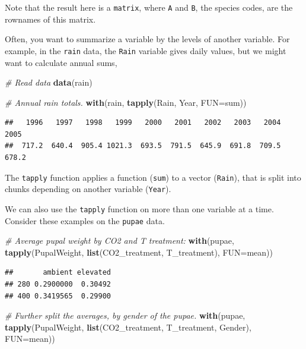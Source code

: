 \documentclass[]{book}
\newenvironment{Shaded}{\begin{snugshade}}{\end{snugshade}}
\newcommand{\CommentTok}[1]{\textcolor[rgb]{0.56,0.35,0.01}{\textit{#1}}}
\newcommand{\DataTypeTok}[1]{\textcolor[rgb]{0.13,0.29,0.53}{#1}}
\newcommand{\KeywordTok}[1]{\textcolor[rgb]{0.13,0.29,0.53}{\textbf{#1}}}
\newcommand{\NormalTok}[1]{#1}
\begin{document}
Note that the result here is a \texttt{matrix}, where \texttt{A} and \texttt{B}, the species codes, are the rownames of this matrix.

Often, you want to summarize a variable by the levels of another variable. For example, in the \texttt{rain} data, the \texttt{Rain} variable gives daily values, but we might want to calculate annual sums,

\begin{Shaded}
\begin{Highlighting}[]
\CommentTok{# Read data}
\KeywordTok{data}\NormalTok{(rain)}

\CommentTok{# Annual rain totals.}
\KeywordTok{with}\NormalTok{(rain, }\KeywordTok{tapply}\NormalTok{(Rain, Year, }\DataTypeTok{FUN=}\NormalTok{sum))}
\end{Highlighting}
\end{Shaded}

\begin{verbatim}
##   1996   1997   1998   1999   2000   2001   2002   2003   2004   2005 
##  717.2  640.4  905.4 1021.3  693.5  791.5  645.9  691.8  709.5  678.2
\end{verbatim}

The \texttt{tapply} function applies a function (\texttt{sum}) to a vector (\texttt{Rain}), that is split into chunks depending on another variable (\texttt{Year}).

We can also use the \texttt{tapply} function on more than one variable at a time. Consider these examples on the \texttt{pupae} data.

\begin{Shaded}
\begin{Highlighting}[]
\CommentTok{# Average pupal weight by CO2 and T treatment:}
\KeywordTok{with}\NormalTok{(pupae, }\KeywordTok{tapply}\NormalTok{(PupalWeight, }\KeywordTok{list}\NormalTok{(CO2_treatment, T_treatment), }\DataTypeTok{FUN=}\NormalTok{mean))}
\end{Highlighting}
\end{Shaded}

\begin{verbatim}
##       ambient elevated
## 280 0.2900000  0.30492
## 400 0.3419565  0.29900
\end{verbatim}

\begin{Shaded}
\begin{Highlighting}[]
\CommentTok{# Further split the averages, by gender of the pupae.}
\KeywordTok{with}\NormalTok{(pupae, }\KeywordTok{tapply}\NormalTok{(PupalWeight, }\KeywordTok{list}\NormalTok{(CO2_treatment, T_treatment, Gender), }\DataTypeTok{FUN=}\NormalTok{mean))}
\end{Highlighting}
\end{Shaded}
\end{document}
